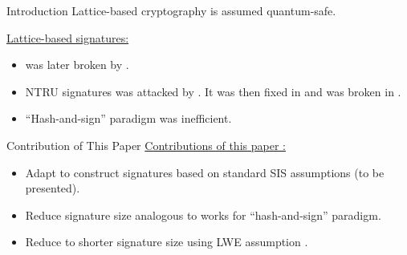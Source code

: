 \begin{frame}{Introduction}
	Lattice-based cryptography is assumed quantum-safe.
	
	\underline{Lattice-based signatures:}
	\begin{itemize}
		\item \cite{GoldreichGH97a} was later broken by \cite{NguyenR09}.
		\item NTRU signatures \cite{HoffsteinPS01} was attacked by \cite{GentryS02}. It was then fixed in \cite{HoffsteinHPSW03} and was broken in \cite{NguyenR09}.
		\item ``Hash-and-sign'' paradigm \cite{GentryPV08} was inefficient.
	\end{itemize}
\end{frame}
\begin{frame}{Contribution of This Paper}
	\underline{Contributions of this paper \cite{Lyubashevsky12}:}
	\begin{itemize}
		\item Adapt \cite{Lyubashevsky09} to construct signatures based on standard SIS assumptions (to be presented).
		\item Reduce signature size analogous to works for ``hash-and-sign'' paradigm.
		\item Reduce to shorter signature size using LWE assumption \cite{Regev09}.
	\end{itemize}
\end{frame}